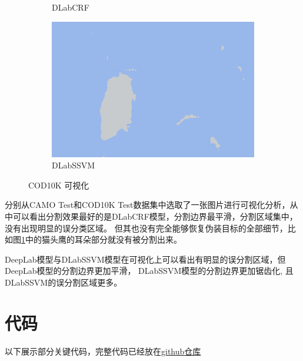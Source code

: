 \documentclass[a4paper,12pt]{ctexart}
\begin{document}
\begin{figure}[h!]
\begin{subfigure}{0.25\textwidth}
        \caption{DLabCRF}
    \end{subfigure}%
    \hfill
    \begin{subfigure}{0.25\textwidth}
        \centering
        \includegraphics[width=\linewidth]{figures/COD10K_demo1/COD10K_demo1_pred_dlap.png}
        \caption{DLabSSVM}
    \end{subfigure}
    
    \caption{COD10K 可视化 \label{fig:COD10K_demo1}}
\end{figure}

分别从CAMO Test和COD10K Test数据集中选取了一张图片进行可视化分析，从中可以看出分割效果最好的是DLabCRF模型，分割边界最平滑，分割区域集中，没有出现明显的误分类区域。
但其也没有完全能够恢复伪装目标的全部细节，比如图\ref{fig:COD10K_demo1}中的猫头鹰的耳朵部分就没有被分割出来。

DeepLab模型与DLabSSVM模型在可视化上可以看出有明显的误分割区域，但DeepLab模型的分割边界更加平滑，
DLabSSVM模型的分割边界更加锯齿化, 且DLabSSVM的误分割区域更多。

\section{代码}
以下展示部分关键代码，完整代码已经放在\href{https://github.com/ottozhao-void/Camouflaged_Object_Analysis}{github仓库}
\end{document}
